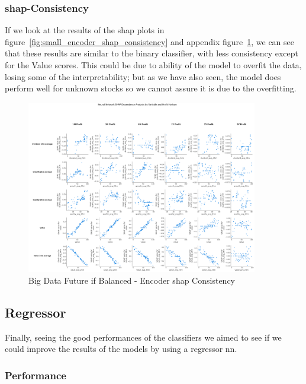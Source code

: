 \documentclass[11pt,english,a4paper,hidelinks]{book}
\begin{document}
\subsubsection{\acrshort{shap}-Consistency}

If we look at the results of the \gls{shap} plots in figure~\ref{fig:small_encoder_shap_consistency} and appendix figure~\ref{fig:big_encoder_shap_consistency}, we can see that these results are similar to the binary classifier, with less consistency except for the Value scores. This could be due to ability of the model to overfit the data, losing some of the interpretability; but as we have also seen, the model does perform well for unknown stocks so we cannot assure it is due to the overfitting.

\begin{figure}[H]
    \centering
    \includegraphics[width=0.9\textwidth]{images/code/models/neural_network/binary_classifier_nn/Big Data future - IF HARD Balanced/shap_table_analysis.png}
    \caption{Big Data Future \acrshort{if} Balanced - Encoder \gls{shap} Consistency}
    \label{fig:big_encoder_shap_consistency}
\end{figure}

\subsection{Regressor}

\noindent Finally, seeing the good performances of the classifiers we aimed to see if we could improve the results of the models by using a regressor \acrshort{nn}.

\subsubsection{Performance}
\end{document}
